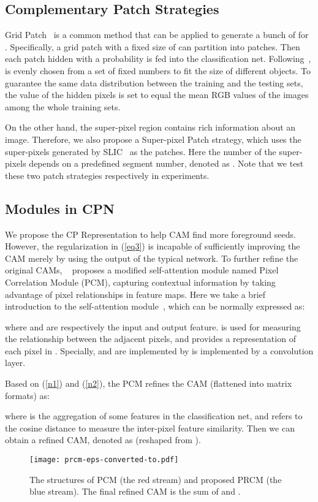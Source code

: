\documentclass[10pt,twocolumn,letterpaper]{article}
\begin{document}
\subsection{Complementary Patch Strategies} \label{sec_strategy}
Grid Patch~\cite{has, REDA} is a common method that can be applied to generate a bunch of  for . Specifically, a grid patch with a fixed size of  can partition  into  patches. Then each patch hidden with a probability  is fed into the classification net. Following~\cite{has},  is evenly chosen from a set  of fixed numbers to fit the size of different objects. To guarantee the same data distribution between the training and the testing sets, the value of the hidden pixels is set to equal the mean RGB values of the images among the whole training sets.

On the other hand, the super-pixel region contains rich information about an image. Therefore, we also propose a Super-pixel Patch strategy, which uses the super-pixels generated by SLIC~\cite{slic} as the patches. Here the number of the super-pixels depends on a predefined segment number, denoted as . Note that we test these two patch strategies respectively in experiments.
\subsection{Modules in CPN}
We propose the CP Representation to help CAM find more foreground seeds. However, the regularization in (\ref{eq3}) is incapable of sufficiently improving the CAM merely by using the output of the typical network. To further refine the original CAMs, ~\cite{seam} proposes a modified self-attention module named Pixel Correlation Module (PCM), capturing contextual information by taking advantage of pixel relationships in feature maps. Here we take a brief introduction to the self-attention module~\cite{nonlocal}, which can be normally expressed as:
 

where  and  are respectively the input and output feature.  is used for measuring the relationship between the adjacent pixels, and  provides a representation of each pixel in . Specially,  and  are implemented by is implemented by a  convolution layer.

Based on (\ref{n1}) and (\ref{n2}), the PCM refines the CAM  (flattened into matrix formats) as:


where  is the aggregation of some features in the classification net, and  refers to the cosine distance to measure the inter-pixel feature similarity. Then we can obtain a refined CAM, denoted as  (reshaped from ).
\begin{figure}
\begin{center}
\texttt{[image: prcm-eps-converted-to.pdf]}
\end{center}
\vspace{-4mm}
   \caption{The structures of PCM (the red stream) and proposed PRCM (the blue stream). The final refined CAM  is the sum of  and .}
\label{fig:prcm}
\vspace{-2mm}
\end{figure}
\end{document}
